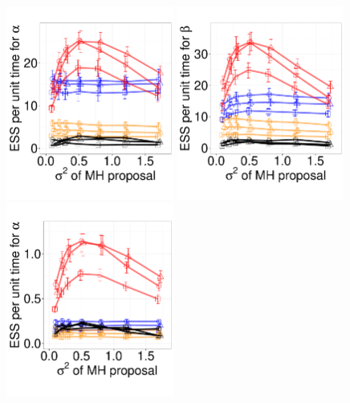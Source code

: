   \begin{figure}[H]
  \centering
  \begin{minipage}[!hp]{0.69\linewidth}
  \centering
    \includegraphics [width=0.49\textwidth, angle=0]{figs/exp_3_alpha.pdf}
    \includegraphics [width=0.49\textwidth, angle=0]{figs/exp_3_beta.pdf}
    \includegraphics [width=0.49\textwidth, angle=0]{figs/exp_10_alpha.pdf}

\end{minipage}
\end{figure}
